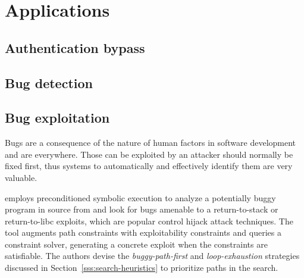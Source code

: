 
\section{Applications}

\subsection{Authentication bypass}
\cite{FIRMALICE-NDSS15}

\subsection{Bug detection}
\cite{RK-ICSE07,DRILLER-NDSS16}
\lipsum[1]

\subsection{Bug exploitation}
Bugs are a consequence of the nature of human factors in software development and are everywhere. Those can be exploited by an attacker should normally be fixed first, thus systems to automatically and effectively identify them are very valuable.

\cite{AEG-NDSS11} employs preconditioned symbolic execution to analyze a potentially buggy program in source from and look for bugs amenable to a return-to-stack or return-to-libc exploits, which are popular control hijack attack techniques. The tool augments path constraints with exploitability constraints and queries a constraint solver, generating a concrete exploit when the constraints are satisfiable. The authors devise the {\em buggy-path-first} and {\em loop-exhaustion} strategies discussed in Section~\ref{sss:search-heuristics} to prioritize paths in the search. 

